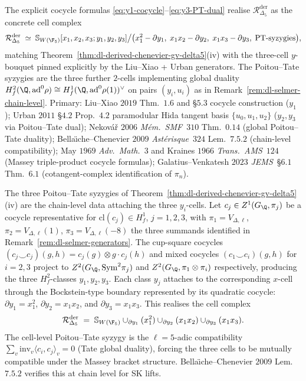 \begin{remark}
\label{rem:dl-selmer-generators-chain}
The explicit cocycle formulas \eqref{eq:y1-cocycle}--\eqref{eq:y3-PT-dual}
realise $\mathcal R^{\mathrm{der}}_{\Delta_5}$ as the concrete cell
complex
\[
 \mathcal R^{\mathrm{der}}_{\Delta_5}
 \;\simeq\;
 \mathbb S_{W(\F_5)}[x_1, x_2, x_3; y_1, y_2, y_3]
 \big/\bigl(x_1^2 - \partial y_1,\;
 x_1 x_2 - \partial y_2,\;
 x_1 x_3 - \partial y_3,\;
 \mathrm{PT}\text{-syzygies}\bigr),
\]
matching Theorem~\ref{thm:dl-derived-chenevier-gv-delta5}(iv) with the
three-cell $y$-bouquet pinned explicitly by the Liu--Xiao + Urban
generators. The Poitou--Tate syzygies are the three further
$2$-cells implementing global duality
$H^2_f(\Q,\mathrm{ad}^0\rho)\cong H^1_f(\Q,\mathrm{ad}^0\rho(1))^\vee$
on pairs $(y_i, u_i)$ as in Remark~\ref{rem:dl-selmer-chain-level}.
Primary: Liu--Xiao $2019$ Thm.~$1.6$ and \S $5.3$ cocycle construction
($y_1$); Urban $2011$ \S $4.2$ Prop.~$4.2$ paramodular Hida tangent
basis $\{u_0, u_1, u_2\}$ ($y_2, y_3$ via Poitou--Tate dual);
Nekov\'a\v{r} $2006$ \emph{M\'em.~SMF}~$310$ Thm.~$0.14$ (global
Poitou--Tate duality); Bella\"\i che--Chenevier $2009$
\emph{Ast\'erisque}~$324$ Lem.~$7.5.2$ (chain-level compatibility);
May $1969$ \emph{Adv.\ Math.}~$3$ and Kraines $1966$
\emph{Trans.\ AMS}~$124$ (Massey triple-product cocycle formulas);
Galatius--Venkatesh $2023$ \emph{JEMS}\ \S $6.1$ Thm.~$6.1$
(cotangent-complex identification of $\pi_n$).
\end{remark}

\begin{remark}
\label{rem:dl-selmer-chain-level}
The three Poitou--Tate syzygies of
Theorem~\ref{thm:dl-derived-chenevier-gv-delta5}(iv) are the chain-level
data attaching the three $y_i$-cells. Let
$c_j\in Z^1(G_\Q,\pi_j)$ be a cocycle representative for
$\mathrm{cl}(c_j) \in H^1_f$, $j = 1, 2, 3$, with
$\pi_1 = V_{\Delta,\ell}$, $\pi_2 = V_{\Delta,\ell}(1)$, $\pi_3 = V_{\Delta,\ell}(-8)$
the three summands identified in
Remark~\ref{rem:dl-selmer-generators}. The cup-square cocycles
$(c_j \smile c_j)(g,h) = c_j(g)\otimes g\!\cdot\!c_j(h)$ and mixed
cocycles $(c_1\smile c_i)(g,h)$ for $i = 2, 3$ project to
$Z^2(G_\Q,\mathrm{Sym}^2\pi_j)$ and $Z^2(G_\Q,\pi_1\otimes\pi_i)$
respectively, producing the three $H^2_f$-classes $y_1, y_2, y_3$.
Each class $y_j$ attaches to the corresponding $x$-cell through the
Bockstein-type boundary represented by its quadratic cocycle:
$\partial y_1=x_1^2$, $\partial y_2=x_1x_2$, and
$\partial y_3=x_1x_3$. This realises the cell complex
\[
 \mathcal R^{\mathrm{der}}_{\Delta_5}
 \;=\;
 \mathbb S_{W(\F_5)}\cup_{\partial y_1}(x_1^2)
 \cup_{\partial y_2}(x_1 x_2)
 \cup_{\partial y_3}(x_1 x_3).
\]
The cell-level Poitou--Tate syzygy is the $\ell = 5$-adic compatibility
$\sum_v \mathrm{inv}_v\langle c_i, c_j\rangle_v = 0$ (Tate
global duality), forcing the three cells to be mutually compatible
under the Massey bracket structure. Bella\"\i che--Chenevier
$2009$ Lem.~$7.5.2$ verifies this at chain level for SK lifts.
\end{remark}

